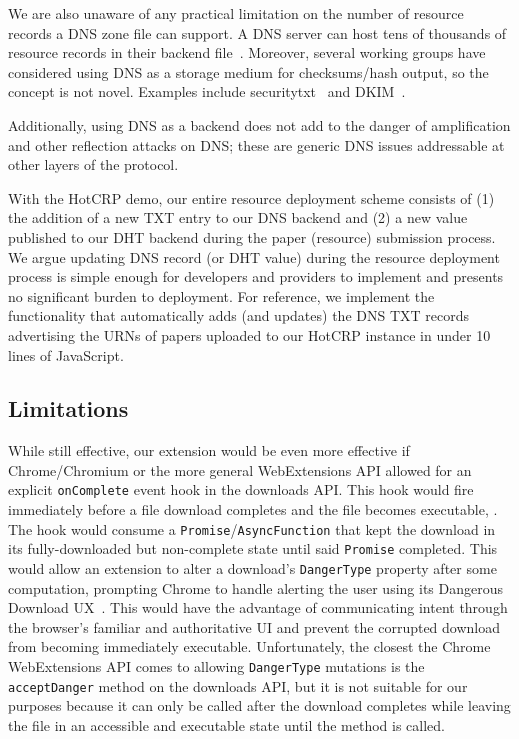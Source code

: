 We are also unaware of any practical limitation on the number of resource
records a DNS zone file can support. A DNS server can host tens of thousands of
resource records in their backend file~\cite{DNS1, DNS2}. Moreover, several
working groups have considered using DNS as a storage medium for checksums/hash
output, so the concept is not novel. Examples include
securitytxt~\cite{draft-sectxt} and DKIM~\cite{DKIM}.

Additionally, using DNS as a backend does not add to the danger of amplification
and other reflection attacks on DNS; these are generic DNS issues addressable at
other layers of the protocol.

With the HotCRP demo, our entire resource deployment scheme consists of (1) the
addition of a new TXT entry to our DNS backend and (2) a new value published to
our DHT backend during the paper (resource) submission process. We argue
updating DNS record (or DHT value) during the resource deployment process is
simple enough for developers and providers to implement and presents no
significant burden to deployment. For reference, we implement the
functionality that automatically adds (and updates) the DNS TXT records
advertising the URNs of papers uploaded to our HotCRP instance in under 10 lines
of JavaScript.

\subsection{Limitations}

While still effective, our extension would be even more effective if
Chrome/Chromium or the more general WebExtensions API allowed for an explicit
\texttt{onComplete} event hook in the downloads API. This hook would fire
immediately before a file download completes and the file becomes executable,
. The
hook would consume a \texttt{Promise}/\texttt{AsyncFunction} that kept the
download in its fully-downloaded but non-complete state until said
\texttt{Promise} completed. This would allow an extension to alter a download's
\texttt{DangerType} property after some computation, prompting Chrome to handle
alerting the user using its Dangerous Download UX~\cite{ChromeClickThrough}.
This would have the advantage of communicating intent through the browser's
familiar and authoritative UI and prevent the corrupted download from becoming
immediately executable. Unfortunately, the closest the Chrome WebExtensions API
comes to allowing \texttt{DangerType} mutations is the \texttt{acceptDanger}
method on the downloads API, but it is not suitable for our purposes because it
can only be called after the download completes while leaving the file in an
accessible and executable state until the method is called.

